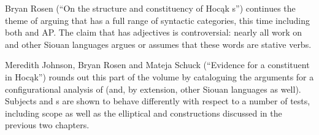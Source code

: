 \begin{refsection}
Bryan Rosen (``On the structure and constituency of Hoc\k{a}k s'') continues the theme of arguing that  has a full range of syntactic categories, this time including both  and AP. The claim that  has adjectives is controversial: nearly all work on  and other Siouan languages argues or assumes that these words are stative verbs.

Meredith Johnson, Bryan Rosen and Mateja Schuck (``Evidence for a  constituent in Hoc\k{a}k'') rounds out this part of the volume by cataloguing the arguments for a configurational analysis of  (and, by extension, other Siouan languages as well). Subjects and s are shown to behave differently with respect to a number of tests, including scope as well as the elliptical and  constructions discussed in the previous two chapters.

 
\end{refsection}

